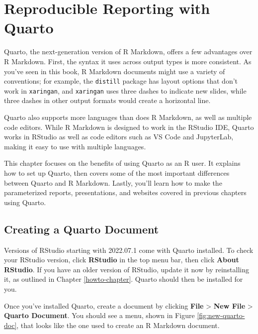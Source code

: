 \documentclass[
]{book}
\begin{document}
\hypertarget{quarto-chapter}{%
\chapter{Reproducible Reporting with Quarto}\label{quarto-chapter}}

Quarto, the next-generation version of R Markdown, offers a few advantages over R Markdown. First, the syntax it uses across output types is more consistent. As you've seen in this book, R Markdown documents might use a variety of conventions; for example, the \texttt{distill} package has layout options that don't work in \texttt{xaringan}, and \texttt{xaringan} uses three dashes to indicate new slides, while three dashes in other output formats would create a horizontal line.

Quarto also supports more languages than does R Markdown, as well as multiple code editors. While R Markdown is designed to work in the RStudio IDE, Quarto works in RStudio as well as code editors such as VS Code and JupyterLab, making it easy to use with multiple languages.

This chapter focuses on the benefits of using Quarto as an R user. It explains how to set up Quarto, then covers some of the most important differences between Quarto and R Markdown. Lastly, you'll learn how to make the parameterized reports, presentations, and websites covered in previous chapters using Quarto.

\hypertarget{creating-a-quarto-document}{%
\section*{Creating a Quarto Document}\label{creating-a-quarto-document}}

Versions of RStudio starting with 2022.07.1 come with Quarto installed. To check your RStudio version, click \textbf{RStudio} in the top menu bar, then click \textbf{About RStudio}. If you have an older version of RStudio, update it now by reinstalling it, as outlined in Chapter \ref{howto-chapter}. Quarto should then be installed for you.

Once you've installed Quarto, create a document by clicking \textbf{File} \textgreater{} \textbf{New File} \textgreater{} \textbf{Quarto Document}. You should see a menu, shown in Figure \ref{fig:new-quarto-doc}, that looks like the one used to create an R Markdown document.
\end{document}

